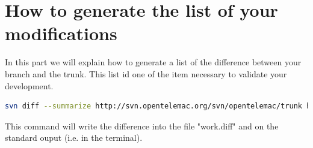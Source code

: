 \section{How to generate the list of your modifications}
%
\label{diff}
In this part we will explain how to generate a list of the difference between
your branch and the trunk. This list id one of the item necessary to validate
your development.
\begin{lstlisting}[language=bash]
svn diff --summarize http://svn.opentelemac.org/svn/opentelemac/trunk http://svn.opentelemac.org/svn/opentelemac/branches/mybranches | tee work.diff
\end{lstlisting}
This command will write the difference into the file "work.diff" and on the
standard ouput (i.e. in the terminal).
%
